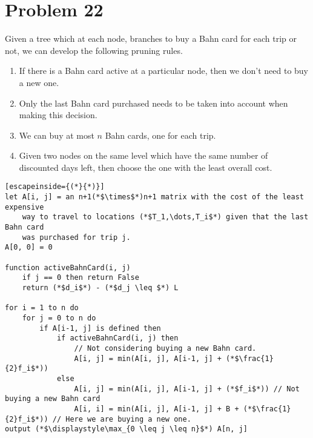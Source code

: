 \documentclass{article}
\providecommand{\prob}[1]{\section*{Problem #1}}
\begin{document}
    \pagebreak
    \prob{22}
    Given a tree which at each node, branches to buy a Bahn card for each trip or not, we can develop the following pruning rules.
    \begin{enumerate}
        \item If there is a Bahn card active at a particular node, then we don't need to buy a new one.
        \item Only the last Bahn card purchased needs to be taken into account when making this decision.
        \item We can buy at most $n$ Bahn cards, one for each trip.
        \item Given two nodes on the same level which have the same number of discounted days left, then choose the one with the least overall cost.
    \end{enumerate}

    \begin{lstlisting}[escapeinside={(*}{*)}]
let A[i, j] = an n+1(*$\times$*)n+1 matrix with the cost of the least expensive
    way to travel to locations (*$T_1,\dots,T_i$*) given that the last Bahn card
    was purchased for trip j.
A[0, 0] = 0

function activeBahnCard(i, j)
    if j == 0 then return False
    return (*$d_i$*) - (*$d_j \leq $*) L

for i = 1 to n do
    for j = 0 to n do
        if A[i-1, j] is defined then
            if activeBahnCard(i, j) then
                // Not considering buying a new Bahn card.
                A[i, j] = min(A[i, j], A[i-1, j] + (*$\frac{1}{2}f_i$*))
            else
                A[i, j] = min(A[i, j], A[i-1, j] + (*$f_i$*)) // Not buying a new Bahn card
                A[i, i] = min(A[i, j], A[i-1, j] + B + (*$\frac{1}{2}f_i$*)) // Here we are buying a new one.
output (*$\displaystyle\max_{0 \leq j \leq n}$*) A[n, j]
    \end{lstlisting}
\end{document}
